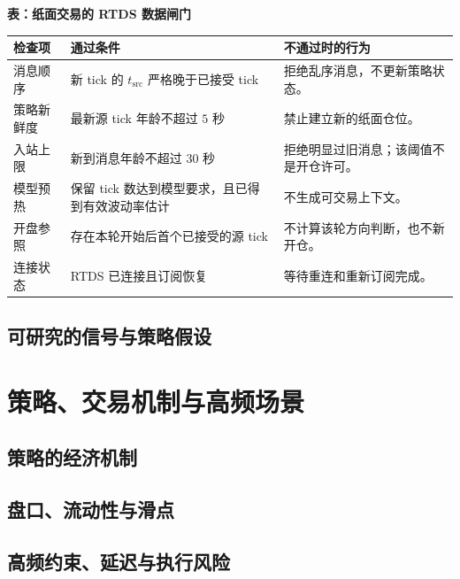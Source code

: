 \begin{center}
\small
\textbf{表：纸面交易的 RTDS 数据闸门}\par\medskip
\begin{tabular}{@{}p{}p{}p{}@{}}
\toprule
检查项 & 通过条件 & 不通过时的行为 \\
\midrule
消息顺序 & 新 tick 的 \(t_{\mathrm{src}}\) 严格晚于已接受 tick & 拒绝乱序消息，不更新策略状态。 \\
策略新鲜度 & 最新源 tick 年龄不超过 \(5\) 秒 & 禁止建立新的纸面仓位。 \\
入站上限 & 新到消息年龄不超过 \(30\) 秒 & 拒绝明显过旧消息；该阈值不是开仓许可。 \\
模型预热 & 保留 tick 数达到模型要求，且已得到有效波动率估计 & 不生成可交易上下文。 \\
开盘参照 & 存在本轮开始后首个已接受的源 tick & 不计算该轮方向判断，也不新开仓。 \\
连接状态 & RTDS 已连接且订阅恢复 & 等待重连和重新订阅完成。 \\
\bottomrule
\end{tabular}
\end{center}


\subsection{可研究的信号与策略假设}


\section{策略、交易机制与高频场景}

\subsection{策略的经济机制}

\subsection{盘口、流动性与滑点}

\subsection{高频约束、延迟与执行风险}

